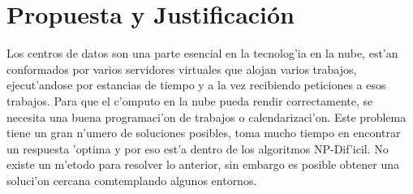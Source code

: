 
\chapter*{Propuesta y Justificaci\'on}


Los centros de datos son una parte esencial en la tecnolog'ia en la nube, est'an conformados por varios servidores virtuales que alojan varios trabajos, ejecut'andose por estancias de tiempo y a la vez recibiendo peticiones a esos trabajos.\cite{shimpy2014different}
Para que el c'omputo en la nube pueda rendir correctamente, se necesita una buena programaci'on de trabajos o calendarizaci'on. Este problema tiene un gran n'umero de soluciones posibles, toma mucho tiempo en encontrar un respuesta 'optima y por eso est'a dentro de los algoritmos NP-Dif'icil. No existe un m'etodo para resolver lo anterior, sin embargo es posible obtener una soluci'on cercana comtemplando algunos entornos.\cite{srinivasan2014cloud} 










